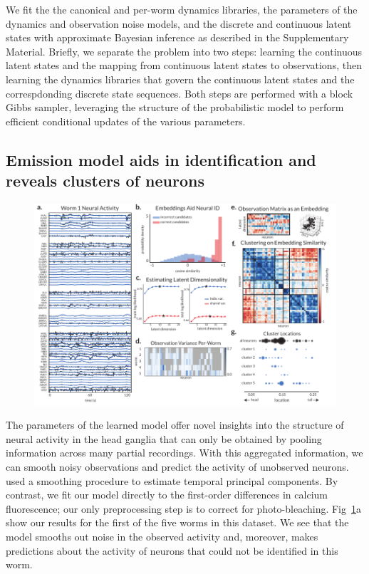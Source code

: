 \documentclass[11pt]{article}
\begin{document}
We fit the the canonical and per-worm dynamics libraries, the
parameters of the dynamics and observation noise models, and the
discrete and continuous latent states with approximate Bayesian
inference as described in the Supplementary Material. Briefly, we
separate the problem into two steps: learning the continuous latent
states and the mapping from continuous latent states to observations,
then learning the dynamics libraries that govern the continuous latent
states and the correspdonding discrete state sequences.  Both steps are
performed with a block Gibbs sampler, leveraging the structure of the
probabilistic model to perform efficient conditional updates of the
various parameters. 

\subsection*{Emission model aids in identification and reveals clusters of neurons}

\begin{figure}[t!]
\centering%
\includegraphics[width=6in]{figures/figure2} 
\caption{}
\label{fig:emissions}
\end{figure}

The parameters of the learned model offer novel insights into the
structure of neural activity in the head ganglia that can only be
obtained by pooling information across many partial recordings.  With
this aggregated information, we can smooth noisy observations and
predict the activity of unobserved neurons. \citet{kato2015global}
used a smoothing procedure to estimate temporal principal components.
By contrast, we fit our model directly to the first-order differences
in calcium fluorescence; our only preprocessing step is to correct for
photo-bleaching. Fig~\ref{fig:emissions}a show our results for the first
of the five worms in this dataset. We see that the model smooths out
noise in the observed activity and, moreover, makes predictions about
the activity of neurons that could not be identified in this worm.
\end{document}
